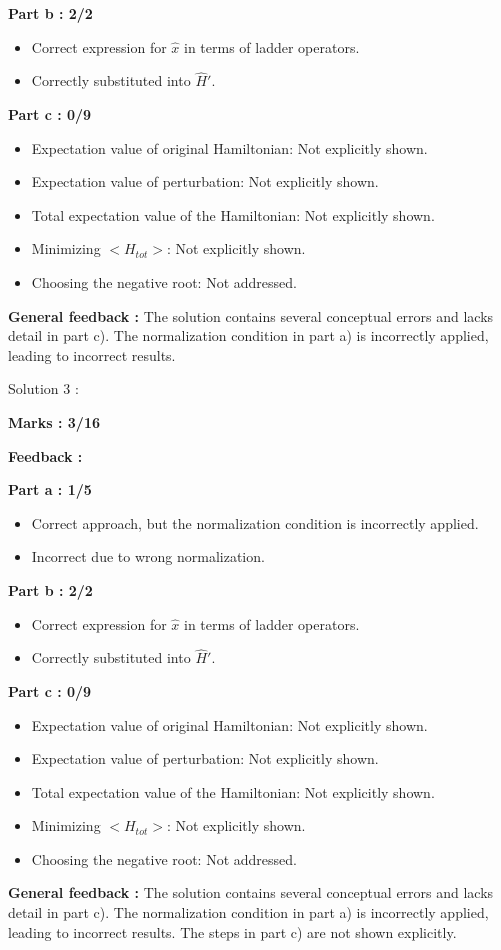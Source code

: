\documentclass[a4paper,11pt]{article}
\begin{document}
\textbf{Part b : 2/2}

\begin{itemize}
    \item Correct expression for $\hat{x}$ in terms of ladder operators.
    \item Correctly substituted into $\hat{H}'$.
\end{itemize}

\textbf{Part c : 0/9}

\begin{itemize}
    \item Expectation value of original Hamiltonian: Not explicitly shown.
    \item Expectation value of perturbation: Not explicitly shown.
    \item Total expectation value of the Hamiltonian: Not explicitly shown.
    \item Minimizing $<H_{tot}>$: Not explicitly shown.
    \item Choosing the negative root: Not addressed.
\end{itemize}

\textbf{General feedback :}
The solution contains several conceptual errors and lacks detail in part c). The normalization condition in part a) is incorrectly applied, leading to incorrect results.



Solution 3 :

\textbf{Marks : 3/16}

\textbf{Feedback :}

\textbf{Part a : 1/5}

\begin{itemize}
    \item Correct approach, but the normalization condition is incorrectly applied.
    \item Incorrect due to wrong normalization.
\end{itemize}

\textbf{Part b : 2/2}

\begin{itemize}
    \item Correct expression for $\hat{x}$ in terms of ladder operators.
    \item Correctly substituted into $\hat{H}'$.
\end{itemize}

\textbf{Part c : 0/9}

\begin{itemize}
    \item Expectation value of original Hamiltonian: Not explicitly shown.
    \item Expectation value of perturbation: Not explicitly shown.
    \item Total expectation value of the Hamiltonian: Not explicitly shown.
    \item Minimizing $<H_{tot}>$: Not explicitly shown.
    \item Choosing the negative root: Not addressed.
\end{itemize}

\textbf{General feedback :}
The solution contains several conceptual errors and lacks detail in part c). The normalization condition in part a) is incorrectly applied, leading to incorrect results. The steps in part c) are not shown explicitly.
\end{document}
